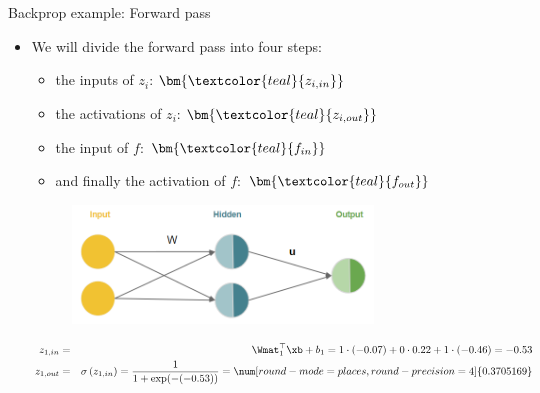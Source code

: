 \begin{vbframe}{Backprop example: Forward pass}

\begin{itemize}
\item We will divide the forward pass into four steps:
\begin{itemize}
\item the inputs of $z_i$: $\bm{\textcolor{teal}{z_{i,in}}}$
\item the activations of $z_i$: $\bm{\textcolor{teal}{z_{i,out}}}$
\item the input of $f$: $\bm{\textcolor{teal}{f_{in}}}$
\item and finally the activation of $f$: $\bm{\textcolor{teal}{f_{out}}}$
\end{itemize}
\begin{figure}
\centering
\includegraphics[width=8cm]{../plots/xor_rep.png}
\end{figure}
\begin{figure}
\centering
{}
\end{figure}
\begin{footnotesize}
\begin{eqnarray*}
z_{1,in} &=& \Wmat_1^\top \xb + b_1 =  1 \cdot (-0.07) + 0 \cdot 0.22 + 1 \cdot (-0.46) = -0.53 \\
z_{1,out} &=& \sigma\left(z_{1,in}\right) = \frac{1}{1+\exp(-(-0.53))} = \num[round-mode=places,round-precision=4]{0.3705169}
\end{eqnarray*}
\end{footnotesize}
\end{itemize}
\framebreak


\end{vbframe}
